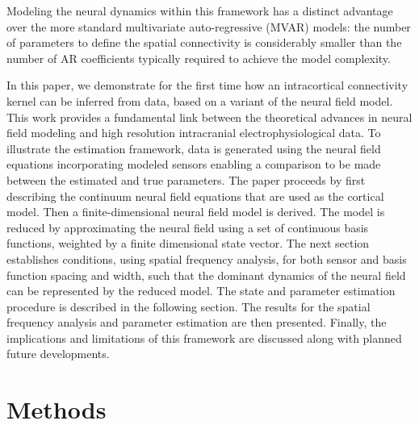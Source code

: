 \documentclass[review,authoryear,3p]{elsarticle}
\begin{document}
Modeling the neural dynamics within this framework has a distinct advantage over the more standard multivariate auto-regressive (MVAR) models: the number of parameters to define the spatial connectivity is considerably smaller than the number of AR coefficients typically required to achieve the model complexity. 

In this paper, we demonstrate for the first time how an intracortical connectivity kernel can be inferred from data, based on a variant of the \citet{Wilson1973} neural field model. This work provides a fundamental link between the theoretical advances in neural field modeling and high resolution intracranial electrophysiological data. To illustrate the estimation framework, data is generated using the neural field equations incorporating modeled sensors enabling a comparison to be made between the estimated and true parameters. The paper proceeds by first describing the continuum neural field equations that are used as the cortical model. Then a finite-dimensional neural field model is derived. The model is reduced by approximating the neural field using a set of continuous basis functions, weighted by a finite dimensional state vector. The next section establishes conditions, using spatial frequency analysis, for both sensor and basis function spacing and width, such that the dominant dynamics of the neural field can be represented by the reduced model. The state and parameter estimation procedure is described in the following section. The results for the spatial frequency analysis and parameter estimation are then presented. Finally, the implications and limitations of this framework are discussed along with planned future developments.

\section{Methods}
\end{document}
